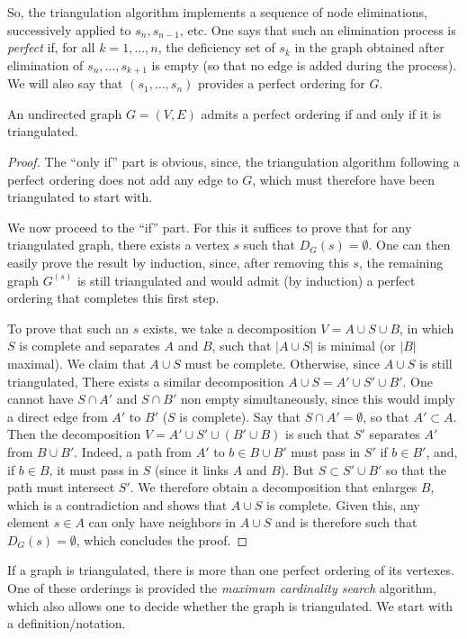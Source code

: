 So, the triangulation algorithm implements a sequence of node
eliminations, successively applied to $s_n, s_{n-1}$, etc. One says
that such an elimination process is {\em perfect} if, for all $k=1,
\ldots, n$,  the deficiency
set of $s_k$ in the graph obtained after elimination of $s_n, \ldots,
s_{k+1}$ is empty (so that no edge is added during the process). We will
also say that $(s_1, \ldots, s_n)$ provides a perfect ordering for
$G$. 
\begin{theorem}
\label{th:perf.order}
An undirected graph $G = (V, E)$ admits a perfect ordering
if and only if it is triangulated.
\end{theorem}
\begin{proof}
The ``only if'' part is obvious, since, the triangulation algorithm following a perfect ordering
  does not add any edge to $G$, which
must therefore have been triangulated to start with.

We now proceed to the ``if'' part. For this it suffices to prove that for any triangulated graph, there exists a vertex $s$ such that $D_G(s) = \emptyset$. One can then easily prove the result by induction, since, after removing this $s$, the remaining graph $G^{(s)}$ is still triangulated and would admit (by induction) a perfect ordering that completes this first step.

To prove that such an $s$ exists, we take a decomposition $V = A \cup S\cup B$, in which $S$ is complete and separates $A$ and $B$,  such that $|A\cup S|$ is minimal (or $|B|$ maximal). We claim that $A\cup S$ must be complete. Otherwise, since $A\cup S$ is still triangulated, There exists a similar decomposition $A\cup S = A'\cup S' \cup B'$. One cannot have $S\cap A'$ and $S\cap B'$ non empty simultaneously, since this would imply a direct edge from $A'$ to $B'$ ($S$ is complete). Say that $S\cap A'=\emptyset$, so that $A'\subset A$. Then the decomposition $V = A'\cup S' \cup (B' \cup B)$ is such that $S'$ separates $A'$ from $B\cup B'$. Indeed, a path from $A'$ to $b\in B\cup B'$ must pass in $S'$ if $b\in B'$, and, if $b
\in B$, it must pass in $S$ (since it links $A$ and $B$). But $S\subset S'\cup B'$  so that the path must intersect  $S'$. We therefore obtain a decomposition that enlarges $B$, which is a contradiction and shows that $A\cup S$ is complete. Given this, any element $s\in A$ can only have neighbors in $A\cup S$ and is therefore such that $D_G(s) = \emptyset$, which concludes the proof.
\end{proof}

If a graph is triangulated, there is more than one perfect ordering of
its vertexes. One of these orderings is provided the {\em maximum
  cardinality search} algorithm, which also allows one to decide
whether the graph is triangulated. We start with a
definition/notation.

